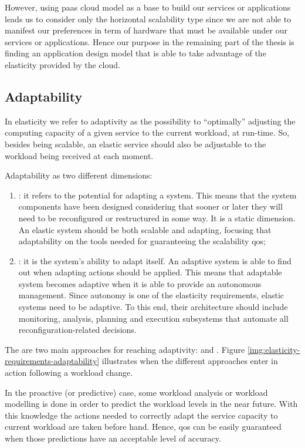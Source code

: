 However, using \ac{paas} cloud model as a base to build our services or applications leads us to consider
only the horizontal scalability type since we are not able to manifest our preferences in term of hardware
that must be available under our services or applications. Hence our purpose in the remaining part of the
thesis is finding an application design model that is able to take advantage of the elasticity
provided by the cloud.

\subsection{Adaptability}
\label{sec:elasticity-requirements-adaptability}
In elasticity we refer to adaptivity as the possibility to ``optimally'' adjusting the computing capacity
of a given service to the current workload, at run-time. So, besides being scalable, an elastic service
should also be adjustable to the workload being received at each moment.

Adaptability as two different dimensions:

\begin{enumerate}
	\item{: it refers to the potential for adapting a system. This means that the
		system components have been designed considering that sooner or later they will need to be
		reconfigured or restructured in some way. It is a static dimension. An elastic system should be
		both scalable and adapting, focusing that adaptability on the tools needed for guaranteeing the
		scalability \ac{qos};}
	\item{: it is the system's ability to adapt itself. An adaptive system is able
		to find out when adapting actions should be applied. This means that adaptable system becomes
		adaptive when it is able to provide an autonomous management. Since autonomy is one of the
		elasticity requirements, elastic systems need to be adaptive. To this end, their architecture
		should include monitoring, analysis, planning and execution subsystems that automate all
		reconfiguration-related decisions.}
\end{enumerate}

The are two main approaches for reaching adaptivity:  and .
Figure \ref{img:elasticity-requirements-adaptability} illustrates when the different approaches
enter in action following a workload change.

In the proactive (or predictive) case, some workload analysis or workload modelling is done in order
to predict the workload levels in the near future. With this knowledge the actions needed to correctly
adapt the service capacity to current workload are taken before hand. Hence, \ac{qos} can be easily
guaranteed when those predictions have an acceptable level of accuracy.

